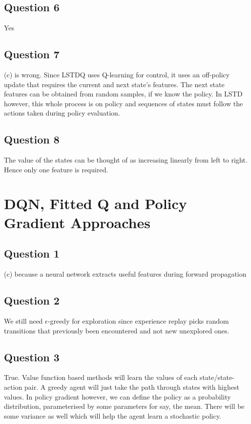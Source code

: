 \documentclass[12pt]{extarticle}
\begin{document}
\subsection{Question 6}
Yes

\subsection{Question 7}
(c) is wrong. Since LSTDQ uses Q-learning for control, it uses an off-policy update that requires the current and next state's features. The next state features can be obtained from random samples, if we know the policy. In LSTD however, this whole process is on policy and sequences of states must follow the actions taken during policy evaluation.

\subsection{Question 8}
The value of the states can be thought of as increasing linearly from left to right. Hence only one feature is required.

\section{DQN, Fitted Q and Policy Gradient Approaches}
\subsection{Question 1}
(c) because a neural network extracts useful features during forward propagation

\subsection{Question 2}
We still need $\epsilon$-greedy for exploration since experience replay picks random transitions that previously been encountered and not new unexplored ones.

\subsection{Question 3}
True. Value function based methods will learn the values of each state/state-action pair. A greedy agent will just take the path through states with highest values. In policy gradient however, we can define the policy as a probability distribution, parameterised by some parameters for say, the mean. There will be some variance as well which will help the agent learn a stochastic policy.
\end{document}
